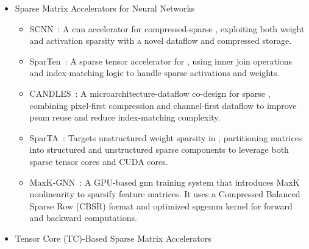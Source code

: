 \begin{itemize}
\begin{itemize}
        \item HitGraph~\cite{Zhou2019_HitGraph}: An \acrshort{fpga} graph accelerator generating separate bitstreams for each graph algorithm, focusing on edge-centric processing.
        \item GraphLily~\cite{Hu2021_GraphLily}: A graph linear algebra overlay for \acrshort{hbm}-equipped , supporting \acrshort{spmv} with a cyclic packed streams of rows (CPSR) format for streaming accesses and a cluster-shared vector buffer (CSVecBuf) to exploit data reuse.
        \item ThunderGP~\cite{Chen2022_ThunderGP}: An \acrshort{fpga}-based graph processing framework using DDR memory, optimized for \acrshort{spmv}.
    \end{itemize}
    \item Sparse Matrix Accelerators for Neural Networks
    \begin{itemize}
        \item SCNN~\cite{Angshuman2017_SCNN}: A \acrshort{cnn} accelerator for compressed-sparse , exploiting both weight and activation sparsity with a novel dataflow and compressed storage.
        \item SparTen~\cite{Gondimalla2019_SparTen}: A sparse tensor accelerator for , using inner join operations and index-matching logic to handle sparse activations and weights.
        \item CANDLES~\cite{Gudaparthi2022_CANDLES}: A microarchitecture-dataflow co-design for sparse , combining pixel-first compression and channel-first dataflow to improve \gls{psum} reuse and reduce index-matching complexity.
        \item SparTA~\cite{Ningxin2022_SparTA}: Targets unstructured weight sparsity in , partitioning matrices into structured and unstructured sparse components to leverage both sparse tensor cores and CUDA cores.
        \item MaxK-GNN~\cite{Peng2024_MaxK-GNN}: A GPU-based \acrshort{gnn} training system that introduces MaxK nonlinearity to sparsify feature matrices.
        It uses a Compressed Balanced Sparse Row (CBSR) format and optimized \acrshort{spgemm} kernel for forward and backward computations.
    \end{itemize}
    \item Tensor Core (TC)-Based Sparse Matrix Accelerators
    \begin{itemize}

\end{itemize}
\end{itemize}
